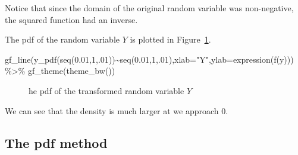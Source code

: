 \documentclass[
  letterpaper,
  DIV=11,
  numbers=noendperiod]{scrreprt}
\newenvironment{Shaded}{\begin{snugshade}}{\end{snugshade}}
\newcommand{\AttributeTok}[1]{\textcolor[rgb]{0.40,0.45,0.13}{#1}}
\newcommand{\DecValTok}[1]{\textcolor[rgb]{0.68,0.00,0.00}{#1}}
\newcommand{\FloatTok}[1]{\textcolor[rgb]{0.68,0.00,0.00}{#1}}
\newcommand{\FunctionTok}[1]{\textcolor[rgb]{0.28,0.35,0.67}{#1}}
\newcommand{\NormalTok}[1]{\textcolor[rgb]{0.00,0.23,0.31}{#1}}
\newcommand{\SpecialCharTok}[1]{\textcolor[rgb]{0.37,0.37,0.37}{#1}}
\newcommand{\StringTok}[1]{\textcolor[rgb]{0.13,0.47,0.30}{#1}}
\begin{document}
Notice that since the domain of the original random variable was
non-negative, the squared function had an inverse.

The pdf of the random variable \(Y\) is plotted in
Figure~\ref{fig-pdf161}.

\begin{Shaded}
\begin{Highlighting}[]
\FunctionTok{gf\_line}\NormalTok{(}\FunctionTok{y\_pdf}\NormalTok{(}\FunctionTok{seq}\NormalTok{(}\FloatTok{0.01}\NormalTok{,}\DecValTok{1}\NormalTok{,.}\DecValTok{01}\NormalTok{))}\SpecialCharTok{\textasciitilde{}}\FunctionTok{seq}\NormalTok{(}\FloatTok{0.01}\NormalTok{,}\DecValTok{1}\NormalTok{,.}\DecValTok{01}\NormalTok{),}\AttributeTok{xlab=}\StringTok{"Y"}\NormalTok{,}\AttributeTok{ylab=}\FunctionTok{expression}\NormalTok{(}\FunctionTok{f}\NormalTok{(y))) }\SpecialCharTok{\%\textgreater{}\%}
  \FunctionTok{gf\_theme}\NormalTok{(}\FunctionTok{theme\_bw}\NormalTok{())}
\end{Highlighting}
\end{Shaded}

\begin{figure}[H]


\caption{\label{fig-pdf161}he pdf of the transformed random variable
\(Y\)}

\end{figure}%

We can see that the density is much larger at we approach 0.

\subsection{The pdf method}\label{the-pdf-method}
\end{document}
